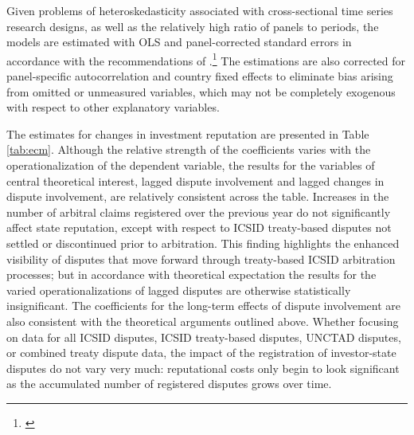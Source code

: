 \documentclass[12pt,onesided]{amsart}
\begin{document}
Given problems of heteroskedasticity associated with cross-sectional time series research designs, as well as the relatively high ratio of panels to periods, the models are estimated with OLS and panel-corrected standard errors in accordance with the recommendations of \citeauthor{beck:katz:1995}.\footnote{\citet{beck:katz:1995}} The estimations are also corrected for panel-specific autocorrelation and country fixed effects to eliminate bias arising from omitted or unmeasured variables, which may not be completely exogenous with respect to other explanatory variables.

The estimates for changes in investment reputation are presented in Table \ref{tab:ecm}. Although the relative strength of the coefficients varies with the operationalization of the dependent variable, the results for the variables of central theoretical interest, lagged dispute involvement and lagged changes in dispute involvement, are relatively consistent across the table. Increases in the number of arbitral claims registered over the previous year do not significantly affect state reputation, except with respect to ICSID treaty-based disputes not settled or discontinued prior to arbitration. This finding highlights the enhanced visibility of disputes that move forward through treaty-based ICSID arbitration processes; but in accordance with theoretical expectation the results for the varied operationalizations of lagged disputes are otherwise statistically insignificant. The coefficients for the long-term effects of dispute involvement are also consistent with the theoretical arguments outlined above. Whether focusing on data for all ICSID disputes, ICSID treaty-based disputes, UNCTAD disputes, or combined treaty dispute data, the impact of the registration of investor-state disputes do not vary very much: reputational costs only begin to look significant as the accumulated number of registered disputes grows over time.

\end{document}
